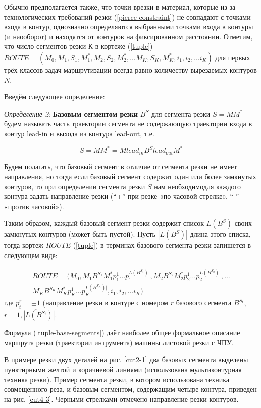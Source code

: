 \documentclass{article}
\begin{document}
Обычно предполагается также,
что точки врезки в материал,
которые из-за технологических требований резки
(\ref{pierce-constraint})
не совпадают с точками входа в контур,
однозначно определяются выбранными точками входа в контуры (и наооборот)
и находятся от контуров на фиксированном расстоянии.
Отметим, что число сегментов резки К в кортеже (\ref{tuple})
$ROUTE = (
  M_0, M_1, S_1, M_1^*, M_2, S_2, M_2^*, \dots M_K, S_K, M_K^*, i_1, i_2, \dots i_K
)$
для первых трёх классов задач маршрутизации всегда равно количеству вырезаемых контуров $N$.

Введём следующее определение:



{\it Определение 2}:
{\bf Базовым сегментом резки}
$B^S$
для сегмента резки
$S=MM^*$
будем называть часть траектории сегмента
не содержающую траектории входа в контур
lead-in и выхода из контура lead-out, т.е.

\begin{equation}
S=MM^* = M lead_{in} B^S lead_{out} M^*
\label{base-segment}
\end{equation}

Будем полагать,
что базовый сегмент в отличие от сегмента резки
не имеет направления,
но тогда если базовый сегмент содержит
один или более замкнутых контуров,
то при определении сегмента резки $S$
нам необходимодля каждого контура задать направление резки
(“+” при резке «по часовой стрелке», “-” «против часовой»).

Таким образом,
каждый базовый сегмент резки
содержит список
$L(B^S)$
своих замкнутых контуров (может быть пустой).
Пусть
$|L(B^S)|$
длина этого списка, тогда кортеж $ROUTE$ (\ref{tuple})
в терминах базового сегмента резки запишется в следующем виде:

\begin{multline}
  ROUTE = (
    M_0, M_1 B^{S_1} M_1^* p_1^1 \dots p_1^{L(B^{S_1})|},
    M_2 B^{S_2} M_2^* p_2^1 \dots p_2^{L(B^{S_2})|},
    \dots \\
    M_K B^{S_K} M_K^* p_K^1 \dots p_K^{L(B^{S_K})|},
    i_1, i_2, \dots i_K
  )
  \label{tuple-base-segments}
\end{multline}
где $p_t^r=\pm 1$
(направление резки в контуре с номером $r$ базового сегмента  $B^{S_t}$,
$r=\overline{1, |L(B^{S_t})|}$.

Формула (\ref{tuple-base-segments})
даёт наиболее общее формальное описание маршрута резки (траектории интрумента)
машины листовой резки с ЧПУ.

В примере резки двух деталей
на рис. \ref{cut2-1}
два базовых сегмента выделены пунктирными
желтой и коричневой линиями
(использована мультиконтурная техника резки).
Пример сегмента резки, в котором использована техника совмещенного реза,
и  базовым сегментом, содержащим четыре контура,
приведен на рис. \ref{cut4-3}.
Черными стрелками отмечено направление резки контуров.
\end{document}
